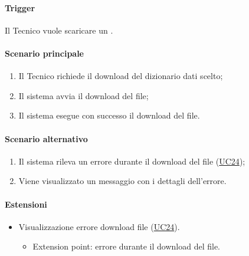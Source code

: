 \paragraph*{Trigger}
Il Tecnico vuole scaricare un .

\paragraph*{Scenario principale}
\begin{enumerate}
  \item Il Tecnico richiede il download del dizionario dati scelto;
  \item Il sistema avvia il download del file;
  \item Il sistema esegue con successo il download del file.
\end{enumerate}

\paragraph*{Scenario alternativo}
\begin{enumerate}
  \item Il sistema rileva un errore durante il download del file (\hyperref[UC24]{UC24});
  \item Viene visualizzato un messaggio con i dettagli dell'errore.
\end{enumerate}

\paragraph*{Estensioni}
\begin{itemize}
  \item Visualizzazione errore download file (\hyperref[UC24]{UC24}).
  \begin{itemize}
    \item Extension point: errore durante il download del file.
  \end{itemize}
\end{itemize}
